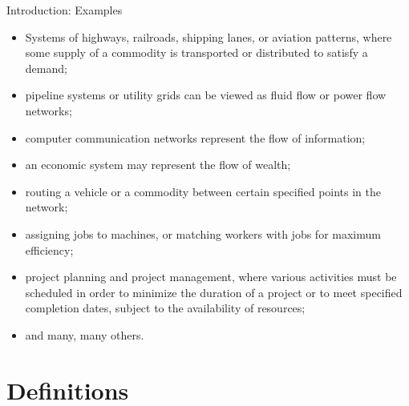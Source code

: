 \documentclass{beamer}
\begin{document}
\begin{frame}{Introduction: Examples}
\begin{itemize}
    \item Systems of highways, railroads, shipping lanes, or aviation patterns, where some supply of a commodity is transported or distributed to satisfy a demand;
    \item pipeline systems or utility grids can be viewed as fluid flow or power flow networks;
    \item computer communication networks represent the flow of information;
    \item an economic system may represent the flow of wealth;
    \item routing a vehicle or a commodity between certain specified points in the network; 
    \item assigning jobs to machines, or matching workers with jobs for maximum efficiency; 
    \item project planning and project management, where various activities must be scheduled in order to minimize the duration of a project or to meet specified completion dates, subject to the availability of resources;
    \item and many, many others.
\end{itemize}
\end{frame}

\section{Definitions}
\end{document}
